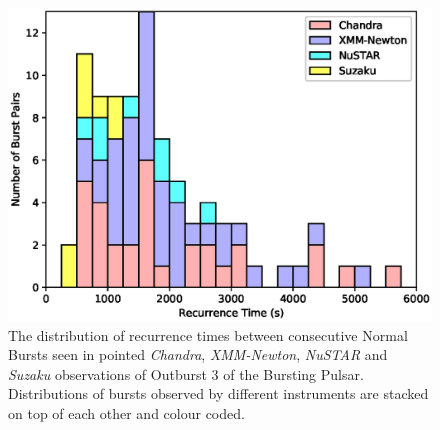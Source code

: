 \begin{figure}
  \centering
  \includegraphics[width=.9\linewidth, trim={0.4cm 0 1.1cm 0},clip]{images/manyinst_stdist.eps}
  \caption[The distribution of recurrence times between consecutive Normal Bursts in Outburst 3.]{\small The distribution of recurrence times between consecutive Normal Bursts seen in pointed \indexchandra\textit{Chandra}, \indexxmm\textit{XMM-Newton}, \indexnustar\textit{NuSTAR} and \indexsuzaku\textit{Suzaku} observations of Outburst 3 of the Bursting Pulsar.  Distributions of bursts observed by different instruments are stacked on top of each other and colour coded.}
  \label{fig:sep}
\end{figure}


